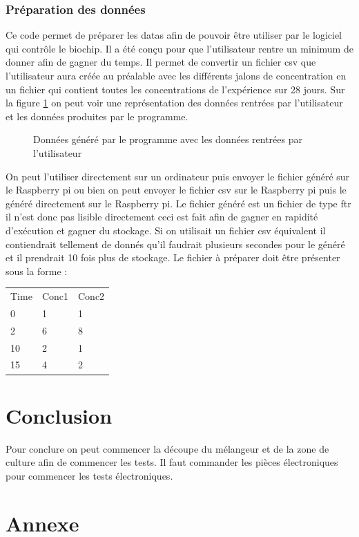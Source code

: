 \documentclass[a4paper, 11pt]{article}
\begin{document}
\subsubsection{Préparation des données}
Ce code permet de préparer les datas afin de pouvoir être utiliser par le logiciel qui contrôle le biochip.
Il a été conçu pour que l'utilisateur rentre un minimum de donner afin de gagner du temps.
Il permet de convertir un fichier csv que l'utilisateur aura créée au préalable avec les différents jalons de concentration en un fichier qui contient toutes les concentrations de l'expérience sur 28 jours.
Sur la figure \ref{fig:dataPreparation} on peut voir une représentation des données rentrées par l'utilisateur et les données produites par le programme.
\begin{figure}[H]
    \centering
    \caption{Données généré par le programme avec les données rentrées par l'utilisateur}
    \label{fig:dataPreparation}
\end{figure}
On peut l'utiliser directement sur un ordinateur puis envoyer le fichier généré sur le Raspberry pi ou bien on peut envoyer le fichier csv sur le Raspberry pi puis le généré directement sur le Raspberry pi.
Le fichier généré est un fichier de type ftr il n'est donc pas lisible directement ceci est fait afin de gagner en rapidité d'exécution et gagner du stockage.
Si on utilisait un fichier csv équivalent il contiendrait tellement de donnés qu'il faudrait plusieurs secondes pour le généré et il prendrait 10 fois plus de stockage.
Le fichier à préparer doit être présenter sous la forme :
\begin{table}[H]
    \centering
    \begin{tabular}{lll}
        Time & Conc1 & Conc2 \\
        0    & 1     & 1     \\
        2    & 6     & 8     \\
        10   & 2     & 1     \\
        15   & 4     & 2
    \end{tabular}
\end{table}
\newpage
\section{Conclusion}
Pour conclure on peut commencer la découpe du mélangeur et de la zone de culture afin de commencer les tests.
Il faut commander les pièces électroniques pour commencer les tests électroniques.
\newpage
\section{Annexe}

\newpage
\printbibliography
\end{document}
